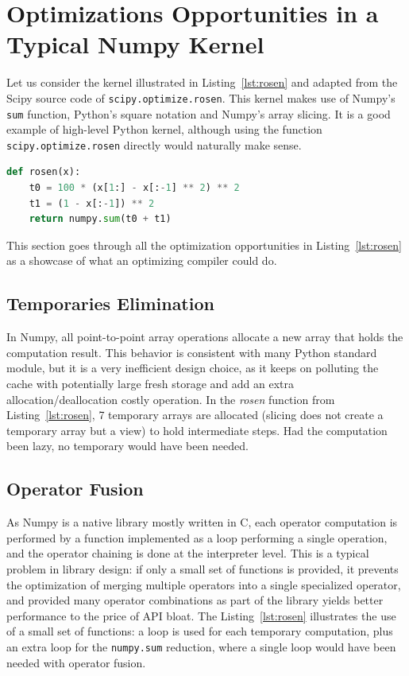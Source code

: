 \documentclass[10pt, preprint]{sigplanconf}
\begin{document}
\section{Optimizations Opportunities in a Typical Numpy Kernel}
\label{sec:optimize}

Let us consider the kernel illustrated in Listing~\ref{lst:rosen} and adapted
from the Scipy source code of \texttt{scipy.optimize.rosen}. This kernel makes
use of Numpy's \texttt{sum} function, Python's square notation and Numpy's
array slicing. It is a good example of high-level Python kernel, although
using the function \texttt{scipy.optimize.rosen} directly would naturally make sense.

\begin{lstlisting}[language=python, caption={High-level implementation of the Rosenbrock function in Numpy.}, label={lst:rosen}]
def rosen(x):
    t0 = 100 * (x[1:] - x[:-1] ** 2) ** 2
    t1 = (1 - x[:-1]) ** 2
    return numpy.sum(t0 + t1)
\end{lstlisting}

This section goes through all the optimization opportunities in
Listing~\ref{lst:rosen} as a showcase of what an optimizing compiler could do.


\subsection{Temporaries Elimination}
\label{sec:temporaries-elimination}

In Numpy, all point-to-point array operations allocate a new array that holds
the computation result. This behavior is consistent with many Python standard
module, but it is a very inefficient design choice, as it keeps on polluting
the cache with potentially large fresh storage and add an extra
allocation/deallocation costly operation. In the \textit{rosen} function from
Listing~\ref{lst:rosen}, 7 temporary arrays are allocated (slicing does not
create a temporary array but a view) to hold intermediate steps. Had the
computation been lazy, no temporary would have been needed.

\subsection{Operator Fusion}
\label{sec:operator-fusion}

As Numpy is a native library mostly written in C, each operator computation is
performed by a function implemented as a loop performing a single operation,
and the operator chaining is done at the interpreter level. This is a typical
problem in library design: if only a small set of functions is provided, it
prevents the optimization of merging multiple operators into a single specialized
operator, and provided many operator combinations as part of the library yields
better performance to the price of API bloat. The Listing~\ref{lst:rosen}
illustrates the use of a small set of functions: a loop is used for
each temporary computation, plus an extra loop for the \texttt{numpy.sum}
reduction, where a single loop would have been needed with operator fusion.
\end{document}
